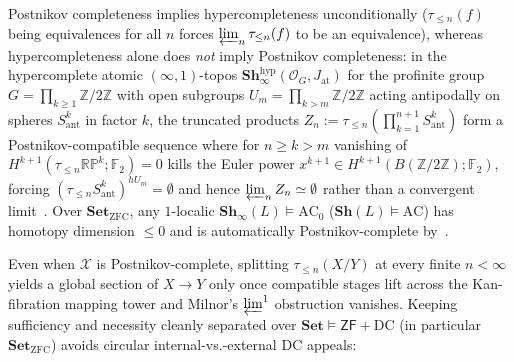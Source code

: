 Postnikov completeness implies hypercompleteness unconditionally ($\tau_{\le n}(f)$ being equivalences for all $n$ forces $\varprojlim_n \tau_{\le n}(f)$ to be an equivalence), whereas hypercompleteness alone does \emph{not} imply Postnikov completeness: in the hypercomplete atomic $(\infty, 1)$-topos $\mathbf{Sh}_\infty^{\mathrm{hyp}}(\mathcal{O}_G, J_{\mathrm{at}})$ for the profinite group $G = \prod_{k \ge 1} \mathbb{Z}/2\mathbb{Z}$ with open subgroups $U_m = \prod_{k > m} \mathbb{Z}/2\mathbb{Z}$ acting antipodally on spheres $S^k_{\mathrm{ant}}$ in factor $k$, the truncated products $Z_n := \tau_{\le n}(\prod_{k=1}^{n+1} S^k_{\mathrm{ant}})$ form a Postnikov-compatible sequence where for $n \ge k > m$ vanishing of $H^{k+1}(\tau_{\le n}\mathbb{RP}^k; \mathbb{F}_2) = 0$ kills the Euler power $x^{k+1} \in H^{k+1}(B(\mathbb{Z}/2\mathbb{Z}); \mathbb{F}_2)$, forcing $(\tau_{\le n} S^k_{\mathrm{ant}})^{hU_m} = \emptyset$ and hence $\varprojlim_n Z_n \simeq \emptyset$ rather than a convergent limit~\cite[\S 7.2.1]{Lurie09}. Over $\mathbf{Set}_{\mathrm{ZFC}}$, any $1$-localic $\mathbf{Sh}_\infty(L) \models \mathrm{AC}_0$ ($\mathbf{Sh}(L) \models \mathrm{AC}$) has homotopy dimension $\le 0$ and is automatically Postnikov-complete by~\cite[Corollary~7.2.1.12]{Lurie09}.

Even when $\mathcal{X}$ is Postnikov-complete, splitting $\tau_{\le n}(X/Y)$ at every finite $n < \infty$ yields a global section of $X \to Y$ only once compatible stages lift across the Kan-fibration mapping tower and Milnor's $\varprojlim^1$ obstruction vanishes. Keeping sufficiency and necessity cleanly separated over $\mathbf{Set} \models \mathsf{ZF} + \mathrm{DC}$ (in particular $\mathbf{Set}_{\mathrm{ZFC}}$) avoids circular internal-vs.-external $\mathrm{DC}$ appeals:

